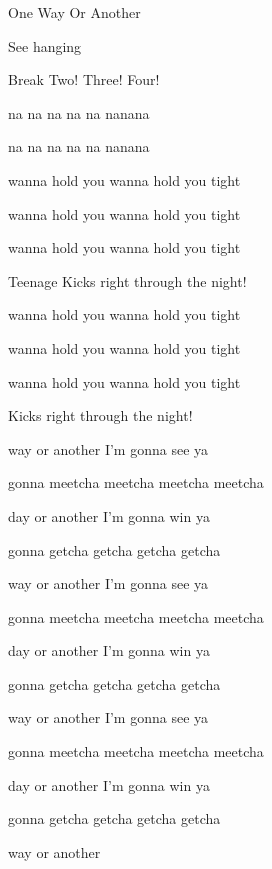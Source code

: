 \begin{SBSong}{One Way Or Another}
\begin{SBVerse}
    See  hanging  
  \end{SBVerse}
  \begin{SBBracket}{Break}
     Two! Three! Four!

     na na na na na nanana

     na na na na na nanana

     wanna hold you wanna hold you tight

     wanna hold you wanna hold you tight

     wanna hold you wanna hold you tight

     Teenage Kicks right through the night!

     wanna hold you wanna hold you tight

     wanna hold you wanna hold you tight

     wanna hold you wanna hold you tight

      Kicks right through the night!
  \end{SBBracket}
  \begin{SBChorus}
     way or another I'm gonna see ya

     gonna meetcha meetcha meetcha meetcha

     day or another I'm gonna win ya

     gonna getcha getcha getcha getcha

     way or another I'm gonna see ya

     gonna meetcha meetcha meetcha meetcha 

     day or another I'm gonna win ya

     gonna getcha getcha getcha getcha

     way or another I'm gonna see ya

     gonna meetcha meetcha meetcha meetcha

     day or another I'm gonna win ya

     gonna getcha getcha getcha getcha

     way or another
  \end{SBChorus}
\end{SBSong}
